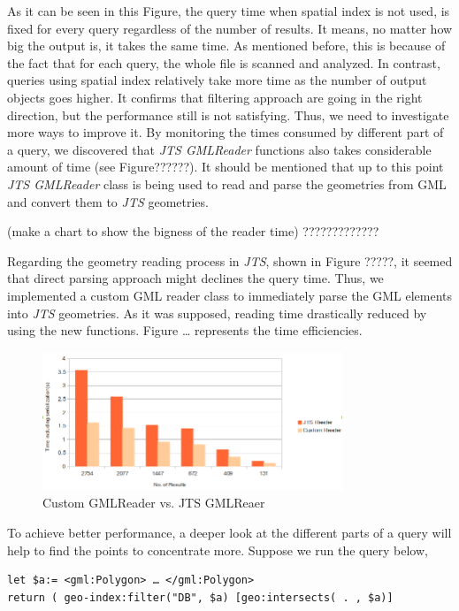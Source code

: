 \documentclass[a4paper,12pt]{article}
\begin{document}
As it can be seen in this Figure, the query time when spatial index is not used, is fixed for every query regardless of the number of results. It means, no matter how big the output is, it takes the same time. As mentioned before, this is because of the fact that for each query, the whole file is scanned and analyzed. In contrast, queries using spatial index relatively take more time as the number of output objects goes higher. It confirms that filtering approach are going in the right direction, but the performance still is not satisfying. Thus, we need to investigate more ways to improve it.
By monitoring the times consumed by different part of a query, we discovered that \textit{JTS GMLReader} functions also takes considerable amount of time (see Figure??????). It should be mentioned that up to this point \textit{JTS GMLReader} class is being used to read and parse the geometries from GML and convert them to \textit{JTS} geometries.  

(make a chart to show the bigness of the reader time) ?????????????

Regarding the geometry reading process in \textit{JTS}, shown in Figure ?????, it seemed that direct parsing approach might declines the query time. Thus, we implemented a custom GML reader class to immediately parse the GML elements into \textit{JTS} geometries. As it was supposed, reading time drastically reduced by using the new functions. Figure … represents the time efficiencies.

\begin{figure}
\centering
\includegraphics[width=0.8\textwidth]{GmlReader}
\caption{Custom GMLReader vs. JTS GMLReaer}
\label{figGmlReader}
\end{figure}


To achieve better performance, a deeper look at the different parts of a query will help to find the points to concentrate more. Suppose we run the query below,

\begin{verbatim}
let $a:= <gml:Polygon> … </gml:Polygon>
return ( geo-index:filter("DB", $a) [geo:intersects( . , $a)]
\end{verbatim}
\end{document}
